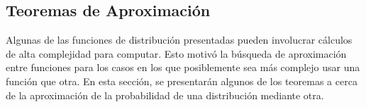 \subsection{Teoremas de Aproximación}
Algunas de las funciones de distribución presentadas pueden involucrar
cálculos de alta complejidad para computar. Esto motivó la búsqueda
de aproximación entre funciones para los casos en los que
posiblemente sea más complejo usar una función que otra. En esta
sección, se presentarán algunos de los teoremas a cerca
de la aproximación de la probabilidad de una distribución mediante
otra.

